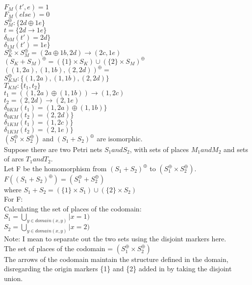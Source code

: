 $F_M (t', e) = 1$\\
$F_M (else) = 0$\\
%
$S_M^\oplus :\{ 2d \oplus 1e\}$\\
$t = \{ 2d \to 1e \}$\\  
$\delta_{0M} (t') = 2d \}$\\
$\delta_{1M} (t') = 1e \}$\\
\smallskip
$S_K^\oplus \times S_M^\oplus = (2a \oplus 1b, 2d) \to (2c, 1e)$\\
\smallskip
$(S_K + S_M)^\oplus = (\{1\} \times S_K) \cup (\{2\} \times S_M)^\oplus$\\
$((1, 2a), (1, 1b), (2, 2d))^\oplus = $\\
$S_{KM}^\oplus: \{(1, 2a), (1, 1b), (2, 2d) \}$\\
$T_{KM}: \{t_1, t_2\}$\\
$t_1 = ((1, 2a) \oplus (1, 1b)) \to (1, 2c)$\\
$t_2 = (2, 2d) \to (2, 1e)$\\
$\delta_{0KM} (t_1) = (1, 2a) \oplus (1, 1b) \}$\\
$\delta_{0KM} (t_2) = (2, 2d) \}$\\
$\delta_{1KM} (t_1) = (1, 2c) \}$\\
$\delta_{1KM} (t_2) = (2, 1e) \}$\\
\smallskip
$(S_1 ^\oplus \times S_2 ^\oplus)$ and $(S_1 + S_2)^\oplus$ are isomorphic. \\
Suppose there are two Petri nets $S_1 and S_2$, with sets of places $M_1 and M_2$ and sets of arcs $T_1 and T_2.$\\
Let F be the homomorphism from $(S_1 + S_2)^\oplus$ to $(S_1 ^\oplus \times S_2 ^\oplus)$. \\
$F((S_1 + S_2)^\oplus) = (S_1 ^\oplus + S_2 ^\oplus)$\\
where $S_1 + S_2 = (\{1\} \times S_1) \cup (\{2\} \times S_2)$\\
For F:\\
Calculating the set of places of the codomain:\\
  $S_1 =  \bigcup_{ y \in domain (x, y)} | x=1)$\\
  $S_2 =  \bigcup_{y \in domain (x, y)} | x=2)$\\
Note: I mean to separate out the two sets using the disjoint markers here.\\
The set of places of the codomain = $(S_1 ^\oplus \times S_2 ^\oplus)$\\
The arrows of the codomain maintain the structure defined in the domain, disregarding the origin markers \{1\} and \{2\} added in by taking the disjoint union.\\
